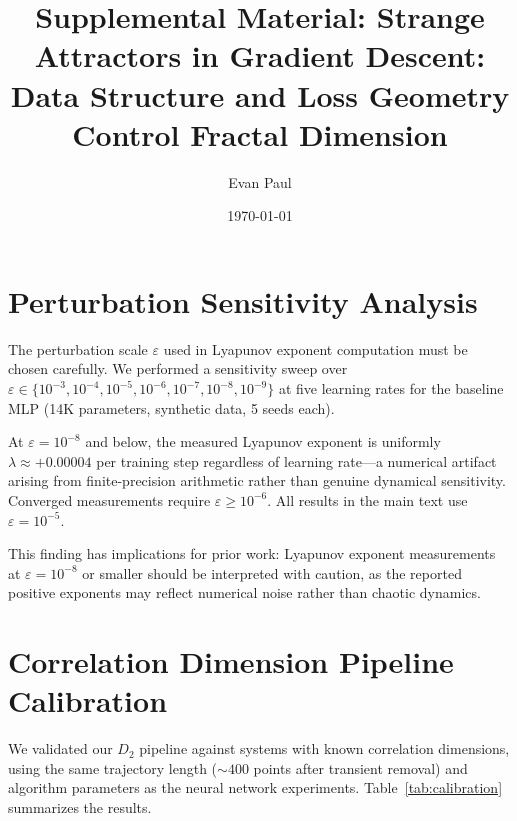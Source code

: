 \documentclass[aps,prl,twocolumn,superscriptaddress]{revtex4-2}
\begin{document}
\title{Supplemental Material: Strange Attractors in Gradient Descent: Data Structure and Loss Geometry Control Fractal Dimension}

\author{Evan Paul}

\date{\today}

\maketitle

\section{Perturbation Sensitivity Analysis}

The perturbation scale $\varepsilon$ used in Lyapunov exponent computation must be chosen carefully. We performed a sensitivity sweep over $\varepsilon \in \{10^{-3}, 10^{-4}, 10^{-5}, 10^{-6}, 10^{-7}, 10^{-8}, 10^{-9}\}$ at five learning rates for the baseline MLP (14K parameters, synthetic data, 5 seeds each).

At $\varepsilon = 10^{-8}$ and below, the measured Lyapunov exponent is uniformly $\lambda \approx +0.00004$ per training step regardless of learning rate---a numerical artifact arising from finite-precision arithmetic rather than genuine dynamical sensitivity. Converged measurements require $\varepsilon \geq 10^{-6}$. All results in the main text use $\varepsilon = 10^{-5}$.

This finding has implications for prior work: Lyapunov exponent measurements at $\varepsilon = 10^{-8}$ or smaller should be interpreted with caution, as the reported positive exponents may reflect numerical noise rather than chaotic dynamics.

\section{Correlation Dimension Pipeline Calibration}

We validated our $D_2$ pipeline against systems with known correlation dimensions, using the same trajectory length (${\sim}400$ points after transient removal) and algorithm parameters as the neural network experiments. Table~\ref{tab:calibration} summarizes the results.
\end{document}

